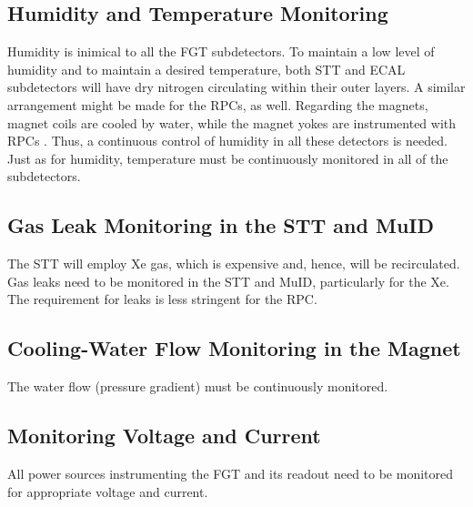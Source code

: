 \subsection{Humidity and Temperature Monitoring } %

Humidity is inimical  to all the FGT subdetectors. To maintain a low level of 
humidity and to maintain a desired temperature, both STT and ECAL subdetectors
will have dry nitrogen circulating within their outer layers. A similar arrangement 
might be made for the RPCs, as well. Regarding the magnets, magnet coils are cooled by water, 
while the magnet yokes are instrumented with RPCs .  Thus, a continuous control of 
humidity in all these detectors is needed.
Just as for humidity, temperature must be continuously monitored in all of the subdetectors. 

\subsection{Gas Leak Monitoring in the STT and MuID}

The STT will employ Xe gas, which is expensive and, hence, will be recirculated.  Gas leaks need to be monitored in the STT and MuID, particularly for the Xe.  %
The requirement for leaks is less 
stringent for the RPC. 

\subsection{Cooling-Water Flow Monitoring in the Magnet}

The water flow (pressure gradient) must be continuously monitored.  

\subsection{Monitoring Voltage and Current}

All power sources instrumenting the FGT and its readout need to be monitored for 
appropriate voltage and current.








